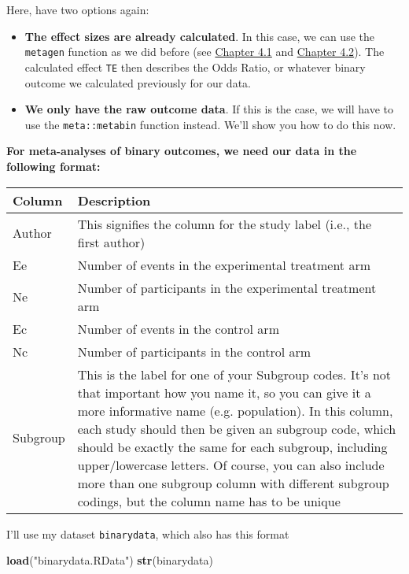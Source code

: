 \documentclass[]{book}
\newenvironment{Shaded}{\begin{snugshade}}{\end{snugshade}}
\newcommand{\KeywordTok}[1]{\textcolor[rgb]{0.13,0.29,0.53}{\textbf{#1}}}
\newcommand{\StringTok}[1]{\textcolor[rgb]{0.31,0.60,0.02}{#1}}
\newcommand{\NormalTok}[1]{#1}
\providecommand{\tightlist}{%
  \setlength{\itemsep}{0pt}\setlength{\parskip}{0pt}}
\theoremstyle{definition}
\theoremstyle{definition}
\theoremstyle{definition}
\theoremstyle{remark}
\begin{document}
Here, have two options again:

\begin{itemize}
\tightlist
\item
  \textbf{The effect sizes are already calculated}. In this case, we can
  use the \texttt{metagen} function as we did before (see
  \protect\hyperlink{fixed}{Chapter 4.1} and
  \protect\hyperlink{random}{Chapter 4.2}). The calculated effect
  \texttt{TE} then describes the Odds Ratio, or whatever binary outcome
  we calculated previously for our data.
\item
  \textbf{We only have the raw outcome data}. If this is the case, we
  will have to use the \texttt{meta::metabin} function instead. We'll
  show you how to do this now.
\end{itemize}

\textbf{For meta-analyses of binary outcomes, we need our data in the
following format:}

\begin{tabular}{l|l}
\hline
Column & Description\\
\hline
Author & This signifies the column for the study label (i.e., the first author)\\
\hline
Ee & Number of events in the experimental treatment arm\\
\hline
Ne & Number of participants in the experimental treatment arm\\
\hline
Ec & Number of events in the control arm\\
\hline
Nc & Number of participants in the control arm\\
\hline
Subgroup & This is the label for one of your Subgroup codes. It's not that important how you name it, so you can give it a more informative name (e.g. population). In this column, each study should then be given an subgroup code, which should be exactly the same for each subgroup, including upper/lowercase letters. Of course, you can also include more than one subgroup column with different subgroup codings, but the column name has to be unique\\
\hline
\end{tabular}

I'll use my dataset \texttt{binarydata}, which also has this format

\begin{Shaded}
\begin{Highlighting}[]
\KeywordTok{load}\NormalTok{(}\StringTok{"binarydata.RData"}\NormalTok{)}
\KeywordTok{str}\NormalTok{(binarydata)}
\end{Highlighting}
\end{Shaded}
\end{document}
